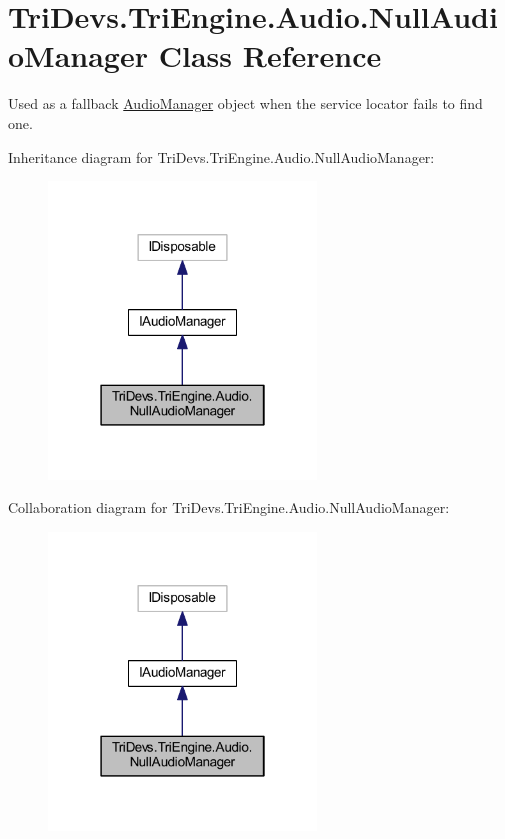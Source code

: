 \hypertarget{class_tri_devs_1_1_tri_engine_1_1_audio_1_1_null_audio_manager}{\section{Tri\-Devs.\-Tri\-Engine.\-Audio.\-Null\-Audio\-Manager Class Reference}
\label{class_tri_devs_1_1_tri_engine_1_1_audio_1_1_null_audio_manager}
}


Used as a fallback \hyperlink{class_tri_devs_1_1_tri_engine_1_1_audio_1_1_audio_manager}{Audio\-Manager} object when the service locator fails to find one.  




Inheritance diagram for Tri\-Devs.\-Tri\-Engine.\-Audio.\-Null\-Audio\-Manager\-:
\nopagebreak
\begin{figure}[H]
\begin{center}
\leavevmode
\includegraphics[width=202pt]{class_tri_devs_1_1_tri_engine_1_1_audio_1_1_null_audio_manager__inherit__graph}
\end{center}
\end{figure}


Collaboration diagram for Tri\-Devs.\-Tri\-Engine.\-Audio.\-Null\-Audio\-Manager\-:
\nopagebreak
\begin{figure}[H]
\begin{center}
\leavevmode
\includegraphics[width=202pt]{class_tri_devs_1_1_tri_engine_1_1_audio_1_1_null_audio_manager__coll__graph}
\end{center}
\end{figure}
